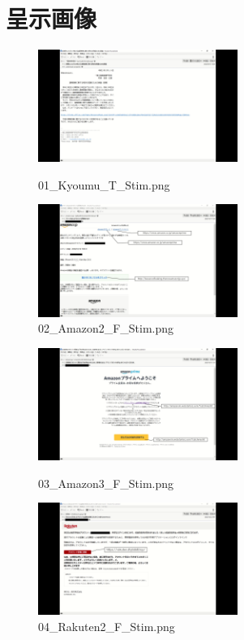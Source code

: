\documentclass[a4paper,11pt]{ltjsreport}
\begin{document}



\appendix
\chapter{呈示画像}
\begin{figure}[H]
	\centering
	\begin{minipage}{0.45\linewidth}
		\centering
		\includegraphics[width=6.5cm]{img/stimuli/01_Kyoumu_T_Stim.png}
		\caption{01\_Kyoumu\_T\_Stim.png}
		\label{fig:a1}
	\end{minipage}
	\begin{minipage}{0.45\linewidth}
		\centering
		\includegraphics[width=6.5cm]{img/stimuli/02_Amazon2_F_Stim.png}
		\caption{02\_Amazon2\_F\_Stim.png}
		\label{fig:a2}
	\end{minipage}
\end{figure}

\begin{figure}[H]
	\centering
	\begin{minipage}{0.45\linewidth}
		\centering
		\includegraphics[width=6.5cm]{img/stimuli/03_Amazon3_F_Stim.png}
		\caption{03\_Amazon3\_F\_Stim.png}
		\label{fig:a3}
	\end{minipage}
	\begin{minipage}{0.45\linewidth}
		\centering
		\includegraphics[width=6.5cm]{img/stimuli/04_Rakuten2_F_Stim.png}
		\caption{04\_Rakuten2\_F\_Stim.png}
		\label{fig:a4}
	\end{minipage}
\end{figure}
\end{document}
